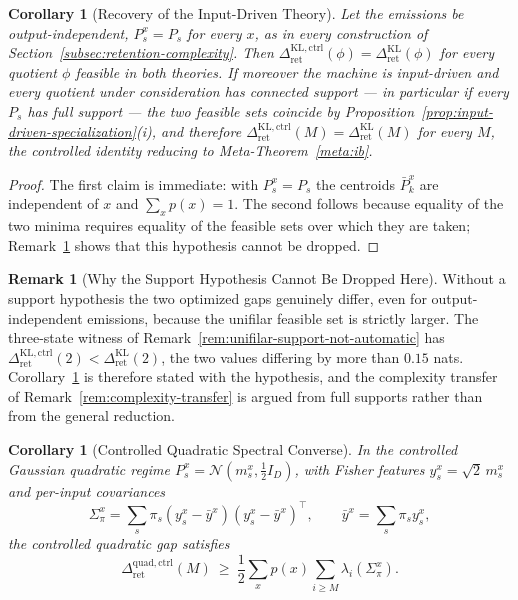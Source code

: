 \documentclass[12pt]{article}
\newtheorem{corollary}[theorem]{Corollary}
\theoremstyle{definition}
\newtheorem{remark}[theorem]{Remark}
\newcommand{\RetKL}{\Delta_{\mathrm{ret}}^{\mathrm{KL}}}
\newcommand{\RetKLc}{\Delta_{\mathrm{ret}}^{\mathrm{KL,ctrl}}}
\newcommand{\RetQuadc}{\Delta_{\mathrm{ret}}^{\mathrm{quad,ctrl}}}
\begin{document}
\begin{corollary}[Recovery of the Input-Driven Theory]
\label{cor:controlled-reduces}
Let the emissions be output-independent, $P_s^x=P_s$ for every $x$, as in every
construction of Section~\ref{subsec:retention-complexity}.  Then
$\RetKLc(\phi)=\RetKL(\phi)$ for every quotient $\phi$ feasible
in both theories.  If moreover the machine is input-driven and every quotient
under consideration has connected support --- in particular if every $P_s$ has
full support --- the two feasible sets coincide by
Proposition~\ref{prop:input-driven-specialization}(i), and therefore
$\RetKLc(M)=\RetKL(M)$ for every $M$, the controlled identity
reducing to Meta-Theorem~\ref{meta:ib}.
\end{corollary}

\begin{proof}
The first claim is immediate: with $P_s^x=P_s$ the centroids $\bar P_k^x$ are
independent of $x$ and $\sum_xp(x)=1$.  The second follows because equality of
the two minima requires equality of the feasible sets over which they are
taken; Remark~\ref{rem:controlled-reduces-sharp} shows that this hypothesis
cannot be dropped.
\end{proof}

\begin{remark}[Why the Support Hypothesis Cannot Be Dropped Here]
\label{rem:controlled-reduces-sharp}
Without a support hypothesis the two optimized gaps genuinely differ, even for
output-independent emissions, because the unifilar feasible set is strictly
larger.  The three-state witness of
Remark~\ref{rem:unifilar-support-not-automatic} has
$\RetKLc(2)<\RetKL(2)$, the two values differing by more than
$0.15$ nats.  Corollary~\ref{cor:controlled-reduces} is therefore stated with
the hypothesis, and the complexity transfer of
Remark~\ref{rem:complexity-transfer} is argued from full supports rather than
from the general reduction.
\end{remark}

\begin{corollary}[Controlled Quadratic Spectral Converse]
\label{cor:controlled-quad-spectral}
In the controlled Gaussian quadratic regime $P_s^x=\mathcal N(m_s^x,\tfrac12I_D)$,
with Fisher features $y_s^x=\sqrt2\,m_s^x$ and per-input covariances
\[
\Sigma_\pi^x=\sum_s\pi_s(y_s^x-\bar y^x)(y_s^x-\bar y^x)^{\!\top},
\qquad
\bar y^x=\sum_s\pi_sy_s^x,
\]
the controlled quadratic gap satisfies
\[
\RetQuadc(M)
\ \ge\
\frac12\sum_xp(x)\sum_{i\ge M}\lambda_i(\Sigma_\pi^x).
\]
\end{corollary}
\end{document}

